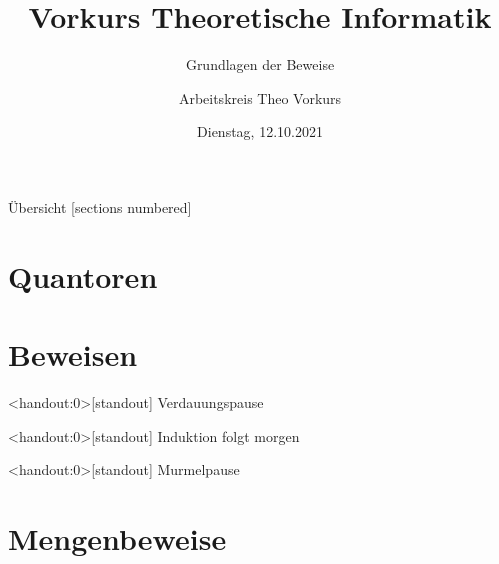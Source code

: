 

\title{Vorkurs Theoretische Informatik}
\subtitle{Grundlagen der Beweise}
\date{Dienstag, 12.10.2021}
\author{Arbeitskreis Theo Vorkurs}



\maketitle

\begin{frame}[fragile]{Übersicht}
  [sections numbered]
  \tableofcontents
\end{frame}

\section{Quantoren}



\section{Beweisen}



\begin{frame}<handout:0>[standout]
	Verdauungspause
\end{frame}









\begin{frame}<handout:0>[standout]
  Induktion folgt morgen
\end{frame}

\begin{frame}<handout:0>[standout]
    Murmelpause
\end{frame}


\section{Mengenbeweise}

